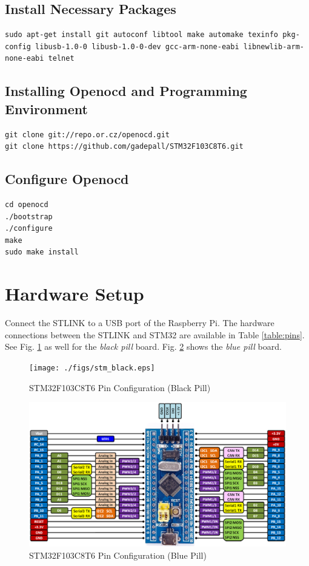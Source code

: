 \documentclass[journal,12pt,twocolumn]{IEEEtran}
\begin{document}
\subsection{ Install Necessary Packages}
\begin{lstlisting}
sudo apt-get install git autoconf libtool make automake texinfo pkg-config libusb-1.0-0 libusb-1.0-0-dev gcc-arm-none-eabi libnewlib-arm-none-eabi telnet
\end{lstlisting}

\subsection{Installing Openocd and Programming Environment}
\begin{lstlisting}
git clone git://repo.or.cz/openocd.git
git clone https://github.com/gadepall/STM32F103C8T6.git
\end{lstlisting}
\subsection{Configure Openocd}
\begin{lstlisting}
cd openocd
./bootstrap
./configure
make
sudo make install
\end{lstlisting}
%

\section{Hardware Setup}
Connect the STLINK to a USB port of the Raspberry Pi.  The hardware connections between the STLINK and STM32 are available in Table \ref{table:pins}. See Fig. \ref{fig:stm_black} as well for the {\em black pill}  board.  Fig. \ref{fig:stm_blue} shows the {\em blue pill} board.
\begin{table}[!h]
\centering

\caption{}
\label{table:pins}
\end{table}
\begin{figure}[!h]
\centering
\texttt{[image: ./figs/stm\_black.eps]}
\caption{STM32F103C8T6 Pin Configuration (Black Pill)}
\label{fig:stm_black}
\end{figure}
%
\begin{figure}[!h]
\centering
\includegraphics[width=\columnwidth]{./figs/stm_blue.eps}
\caption{STM32F103C8T6 Pin Configuration (Blue Pill)}
\label{fig:stm_blue}
\end{figure}
%
\end{document}
